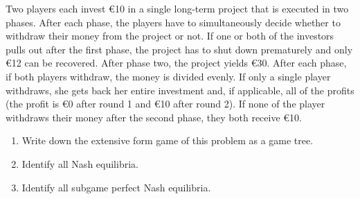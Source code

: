 \documentclass[../main.tex]{subfiles}
\begin{document}
\begin{question}
Two players each invest \euro10 in a single long-term project that is executed in two phases. After each phase, the players have to simultaneously decide whether to withdraw their money from the project or not. If one or both of the investors pulls out after the first phase, the project has to shut down prematurely and only \euro12 can be recovered. After phase two, the project yields \euro30. After each phase, if both players withdraw, the money is divided evenly. If only a single player withdraws, she gets back her entire investment and, if applicable, all of the profits (the profit is \euro0 after round 1 and \euro10 after round 2). If none of the player withdraws their money after the second phase, they both receive \euro10.
\begin{enumerate}
\item Write down the extensive form game of this problem as a game tree.
\item Identify all Nash equilibria.
\item Identify all subgame perfect Nash equilibria.
\end{enumerate}
\end{question}
\end{document}
